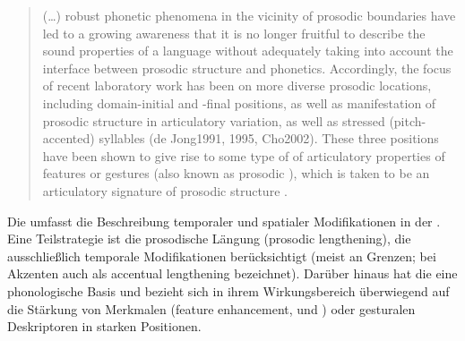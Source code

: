 \begin{quotation}
	(\dots) robust phonetic phenomena in the vicinity of prosodic boundaries have led to a growing awareness that it is no longer fruitful to describe the sound properties of a language without adequately taking into account the interface between prosodic structure and phonetics. Accordingly, the focus of recent laboratory work has been on more diverse prosodic locations, including domain-initial and -final positions, as well as manifestation of prosodic structure in articulatory variation, as well as stressed (pitch-accented) syllables (de Jong1991, 1995, Cho2002). These three positions have been shown to give rise to some type of  of articulatory properties of features or gestures (also known as prosodic ), which is taken to be an articulatory signature of prosodic structure \citep[vgl.][520--521]{Cho2006}.
\end{quotation}

Die  umfasst die Beschreibung temporaler und spatialer Modifikationen in der . Eine Teilstrategie ist die prosodische Längung (prosodic lengthening), die ausschließlich temporale Modifikationen berücksichtigt (meist an Grenzen; bei Akzenten auch als accentual lengthening bezeichnet). Darüber hinaus hat die  eine phonologische Basis und bezieht sich in ihrem Wirkungsbereich überwiegend auf die Stärkung von Merkmalen (feature enhancement, \citealt[][3867]{Cho2005a} und \citealt[][521]{Cho2006}) oder gesturalen Deskriptoren in  starken Positionen.

